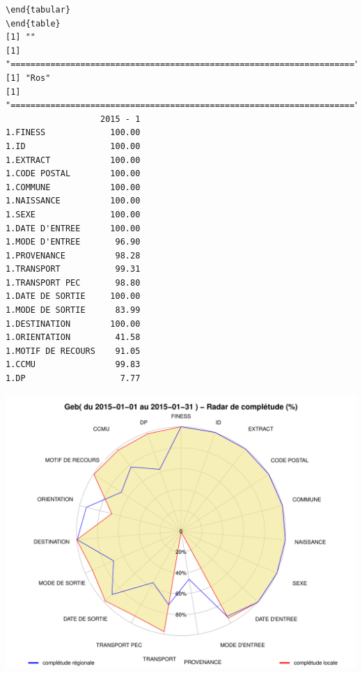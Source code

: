 \documentclass[]{article}
\begin{document}
\begin{verbatim}
\end{tabular} 
\end{table} 
[1] ""
[1] "====================================================================="
[1] "Ros"
[1] "====================================================================="
                   2015 - 1
1.FINESS             100.00
1.ID                 100.00
1.EXTRACT            100.00
1.CODE POSTAL        100.00
1.COMMUNE            100.00
1.NAISSANCE          100.00
1.SEXE               100.00
1.DATE D'ENTREE      100.00
1.MODE D'ENTREE       96.90
1.PROVENANCE          98.28
1.TRANSPORT           99.31
1.TRANSPORT PEC       98.80
1.DATE DE SORTIE     100.00
1.MODE DE SORTIE      83.99
1.DESTINATION        100.00
1.ORIENTATION         41.58
1.MOTIF DE RECOURS    91.05
1.CCMU                99.83
1.DP                   7.77
\end{verbatim}

\includegraphics{completude_files/figure-latex/finess-12.pdf}
\end{document}

